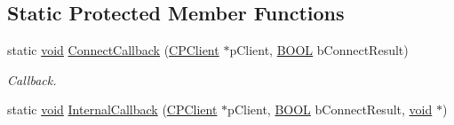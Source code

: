 \subsection*{\-Static \-Protected \-Member \-Functions}
\begin{DoxyCompactItemize}
\item 
static \hyperlink{_cpclient_8h_a6464f7480a0fd0ee170cba12b2c0497f}{void} \hyperlink{class_c_p_client_a03b094fc0dba18e2358a237dd2185b32}{\-Connect\-Callback} (\hyperlink{class_c_p_client}{\-C\-P\-Client} $\ast$p\-Client, \hyperlink{_cpclient_8h_a3be13892ae7076009afcf121347dd319}{\-B\-O\-O\-L} b\-Connect\-Result)
\begin{DoxyCompactList}\small\item\em \-Callback. \end{DoxyCompactList}\item 
static \hyperlink{_cpclient_8h_a6464f7480a0fd0ee170cba12b2c0497f}{void} \hyperlink{class_c_p_client_ab7da7a76df72c5fc8c281d3477d137b8}{\-Internal\-Callback} (\hyperlink{class_c_p_client}{\-C\-P\-Client} $\ast$p\-Client, \hyperlink{_cpclient_8h_a3be13892ae7076009afcf121347dd319}{\-B\-O\-O\-L} b\-Connect\-Result, \hyperlink{_cpclient_8h_a6464f7480a0fd0ee170cba12b2c0497f}{void} $\ast$)
\end{DoxyCompactItemize}
